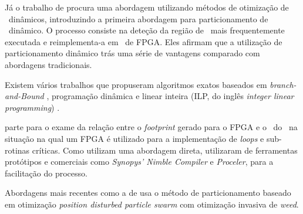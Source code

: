 	Já o trabalho de \cite{Stitt2003} procura uma abordagem utilizando métodos de otimização de \software\ dinâmicos, introduzindo a primeira abordagem para particionamento de \hs\ dinâmico.
	O processo consiste na deteção da região de \software\ mais frequentemente executada e reimplementa-a em \hardware\ de FPGA.
	Eles afirmam que a utilização de particionamento dinâmico trás uma série de vantagens comparado com abordagens tradicionais.

    Existem vários trabalhos que propuseram algoritmos exatos baseados em \textit{branch-and-Bound} \cite{Jigang2004, Mann2007, Strachacki2008}, programação dinâmica \cite{Madsen1997, Wu2006} e linear inteira (ILP, do inglês \textit{integer linear programming}) \cite{Niemann1997}.

	\cite{Nematbakhsh_theeffect} parte para o exame da relação entre o \textit{footprint} gerado para o FPGA e o \speedup\ do \software\ na situação na qual um FPGA é utilizado para a implementação de \textit{loops} e sub-rotinas críticas.
	Como utilizam uma abordagem direta, utilizaram de ferramentas protótipos e comerciais como \textit{Synopys' Nimble Compiler} e \textit{Proceler}, para a facilitação do processo.

	Abordagens mais recentes como a de \cite{Yan2017} usa o método de particionamento \hs baseado em otimização \textit{position disturbed particle swarm} com otimização invasiva de \textit{weed}.

